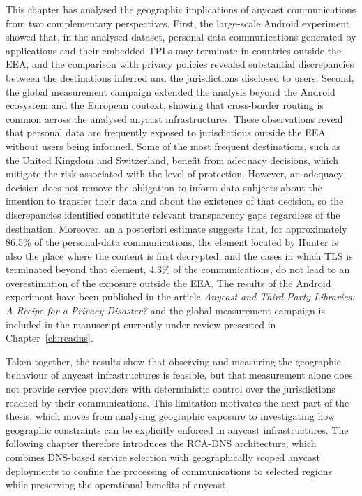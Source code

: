 This chapter has analysed the geographic implications of anycast communications from two complementary perspectives. First, the large-scale Android experiment showed that, in the analysed dataset, personal-data communications generated by applications and their embedded TPLs may terminate in countries outside the EEA, and the comparison with privacy policies revealed substantial discrepancies between the destinations inferred and the jurisdictions disclosed to users. Second, the global measurement campaign extended the analysis beyond the Android ecosystem and the European context, showing that cross-border routing is common across the analysed anycast infrastructures. These observations reveal that personal data are frequently exposed to jurisdictions outside the EEA without users being informed. Some of the most frequent destinations, such as the United Kingdom and Switzerland, benefit from adequacy decisions, which mitigate the risk associated with the level of protection. However, an adequacy decision does not remove the obligation to inform data subjects about the intention to transfer their data and about the existence of that decision, so the discrepancies identified constitute relevant transparency gaps regardless of the destination. Moreover, an a posteriori estimate suggests that, for approximately 86.5\% of the personal-data communications, the element located by Hunter is also the place where the content is first decrypted, and the cases in which TLS is terminated beyond that element, 4.3\% of the communications, do not lead to an overestimation of the exposure outside the EEA. The results of the Android experiment have been published in the article \emph{Anycast and Third-Party Libraries: A Recipe for a Privacy Disaster?} \cite{Pascual2025AnycastDisaster} and the global measurement campaign is included in the manuscript currently under review presented in Chapter~\ref{ch:rcadns}.

Taken together, the results show that observing and measuring the geographic behaviour of anycast infrastructures is feasible, but that measurement alone does not provide service providers with deterministic control over the jurisdictions reached by their communications. This limitation motivates the next part of the thesis, which moves from analysing geographic exposure to investigating how geographic constraints can be explicitly enforced in anycast infrastructures. The following chapter therefore introduces the RCA-DNS architecture, which combines DNS-based service selection with geographically scoped anycast deployments to confine the processing of communications to selected regions while preserving the operational benefits of anycast.
